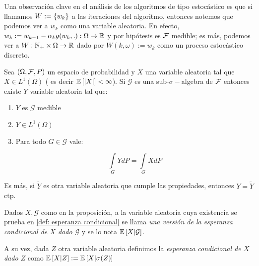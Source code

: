 \begin{remark}
	Una observaci\'on clave en el an\'alisis de los algoritmos de tipo estoc\'astico es que si llamamos ${W} := \left\lbrace w_k\right\rbrace$ a las iteraciones del algoritmo, entonces notemos que podemos ver a $w_k$ como una variable aleatoria. En efecto, $w_k := w_{k-1} - \alpha_k g(w_k, .) : \Omega \rightarrow {\mathbb{R}}$ y por hip\'otesis es $\mathcal{F}$ medible; es m\'as, podemos ver a $W : {\mathbb{N}}_+ \times \Omega \rightarrow {\mathbb{R}}$ dado por $W(k, \omega) := w_k$ como un proceso estoc\'astico discreto.
\end{remark}

\begin{proposition}
	\label{def: esperanza condicional}
	Sea $\left(\Omega, \mathcal{F}, P\right)$ un espacio de probabilidad y $X$ una variable aleatoria tal que $X \in L^1(\Omega)$ ( es decir $\mathbb{E} \left[\left\lvert X\right\rvert\right] < \infty$). Si $\mathcal{G}$ es una sub-$\sigma-$algebra de $\mathcal{F}$ entonces existe $Y$ variable aleatoria tal que:
	
	\begin{enumerate}
		\item $Y$ es $\mathcal{G}$ medible
		\item $Y \in L^1(\Omega)$
		\item Para todo $G \in \mathcal{G}$ vale:
		
		\begin{equation*}
			\int\limits_{G} {Y dP} = \int\limits_{G} {X dP}
		\end{equation*}
	\end{enumerate}

	Es m\'as, si $\widetilde{Y}$ es otra variable aleatoria que cumple las propiedades, entonces $Y = \widetilde{Y}$ ctp.
	
\end{proposition}

\begin{definition}
	Dados $X,\mathcal{G}$ como en la proposici\'on, a la variable aleatoria cuya existencia se prueba en \ref{def: esperanza condicional} se llama \textit{una versi\'on de la esperanza condicional de $X$ dado $\mathcal{G}$} y se lo nota $\mathbb{E} \left[X \vert \mathcal{G}\right]$.
	
	A su vez, dada $Z$ otra variable aleatoria definimos la \textit{esperanza condicional de $X$ dado $Z$} como $\mathbb{E} \left[X \vert Z\right] := \mathbb{E} \left[X \vert \sigma(Z)\right]$
	
\end{definition}

